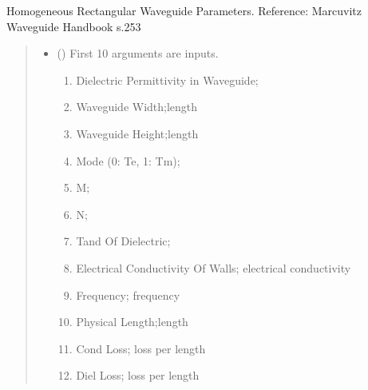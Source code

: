 \documentclass[letterpaper,10pt,english]{sphinxmanual}
\begin{document}
\begin{fulllineitems}
\label{\detokenize{components:components.HomogeneousRectWaveguideParameters_TE}}
\pysigstartsignatures
{}
\pysigstopsignatures
\sphinxAtStartPar
Homogeneous Rectangular Waveguide Parameters.
Reference:  Marcuvitz Waveguide Handbook s.253
\begin{quote}\begin{description}
\begin{itemize}
\item {}
\sphinxAtStartPar
{} () \textendash{}
\sphinxAtStartPar
First 10 arguments are inputs.
\begin{enumerate}
%
\item {}
\sphinxAtStartPar
Dielectric Permittivity in Waveguide;

\item {}
\sphinxAtStartPar
Waveguide Width;length

\item {}
\sphinxAtStartPar
Waveguide Height;length

\item {}
\sphinxAtStartPar
Mode (0: Te, 1: Tm);

\item {}
\sphinxAtStartPar
M;

\item {}
\sphinxAtStartPar
N;

\item {}
\sphinxAtStartPar
Tand Of Dielectric;

\item {}
\sphinxAtStartPar
Electrical Conductivity Of Walls; electrical conductivity

\item {}
\sphinxAtStartPar
Frequency; frequency

\item {}
\sphinxAtStartPar
Physical Length;length

\item {}
\sphinxAtStartPar
Cond Loss; loss per length

\item {}
\sphinxAtStartPar
Diel Loss; loss per length


\end{enumerate}
\end{itemize}
\end{description}
\end{quote}
\end{fulllineitems}
\end{document}
